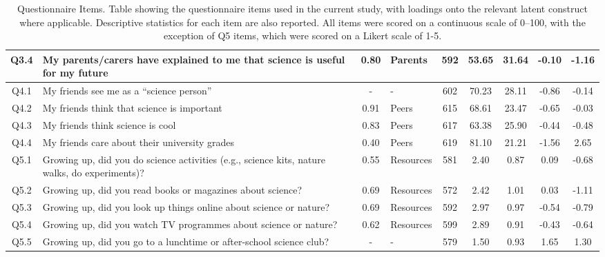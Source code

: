 \begin{landscape}
\begin{table}[ht]
\begin{tabular}[width = \textwidth]{clclccccc}
Q3.4 & \parbox[c]{70mm}{My parents/carers have explained to me that science is useful for my future} & 0.80 & Parents & 592	&53.65	&31.64	& -0.10	&-1.16	\\  
  \hline
Q4.1 & \parbox[c]{70mm}{My friends see me as a ``science person''} & - & - &  602	&70.23&	28.11 &-0.86&-0.14\\
Q4.2 & \parbox[c]{70mm}{My friends think that science is important} & 0.91 & Peers & 615&68.61&	23.47 & -0.65&-0.03 \\
Q4.3 & \parbox[c]{70mm}{My friends think science is cool} & 0.83 & Peers &617&63.38&25.90 & -0.44&-0.48\\ 
Q4.4 & \parbox[c]{70mm}{My friends care about their university grades} & 0.40 & Peers &619&	81.10&	21.21 &-1.56&2.65 \\
  \hline
Q5.1 & \parbox[c]{70mm}{Growing up, did you do science activities (e.g., science kits, nature walks, do experiments)?}  & 0.55 & Resources& 581	&2.40&0.87 & 0.09&-0.68 \\ 
Q5.2 & \parbox[c]{70mm}{Growing up, did you read books or magazines about science?} & 0.69 & Resources &572	&2.42&1.01 & 0.03&-1.11\\
Q5.3 & \parbox[c]{70mm}{Growing up, did you look up things online about science or nature?} & 0.69 & Resources &592&2.97&0.97 &-0.54&-0.79	\\
Q5.4 & \parbox[c]{70mm}{Growing up, did you watch TV programmes about science or nature?} & 0.62 & Resources &599&2.89&0.91 &-0.43&	-0.64\\
Q5.5 & \parbox[c]{70mm}{Growing up, did you go to a lunchtime or after-school science club?} & - &-&579&1.50&0.93 & 1.65&	1.30\\
   \hline
\end{tabular}
\caption{Questionnaire Items. Table showing the questionnaire items used in the current study, with loadings onto the relevant latent construct where applicable. Descriptive statistics for each item are also reported. All items were scored on a continuous scale of 0--100, with the exception of Q5 items, which were scored on a Likert scale of 1-5.} 
\label{tab:ItemMeansSDs}       %
\end{table}
\end{landscape}

